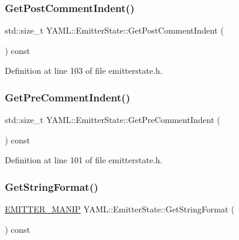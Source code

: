 \subsubsection{\texorpdfstring{GetPostCommentIndent()}{GetPostCommentIndent()}}
{\footnotesize\ttfamily std\+::size\+\_\+t Y\+A\+M\+L\+::\+Emitter\+State\+::\+Get\+Post\+Comment\+Indent (\begin{DoxyParamCaption}{ }\end{DoxyParamCaption}) const\hspace{0.3cm}{\ttfamily [inline]}}



Definition at line 103 of file emitterstate.\+h.

\mbox{\label{class_y_a_m_l_1_1_emitter_state_a21d540fa26b3cb55fd79c4d68d409572}} 
\subsubsection{\texorpdfstring{GetPreCommentIndent()}{GetPreCommentIndent()}}
{\footnotesize\ttfamily std\+::size\+\_\+t Y\+A\+M\+L\+::\+Emitter\+State\+::\+Get\+Pre\+Comment\+Indent (\begin{DoxyParamCaption}{ }\end{DoxyParamCaption}) const\hspace{0.3cm}{\ttfamily [inline]}}



Definition at line 101 of file emitterstate.\+h.

\mbox{\label{class_y_a_m_l_1_1_emitter_state_a16cb8ba88559cfefdf8054c4e7d50b7b}} 
\subsubsection{\texorpdfstring{GetStringFormat()}{GetStringFormat()}}
{\footnotesize\ttfamily \mbox{\hyperlink{namespace_y_a_m_l_a67c320aa50d3de7ecba1d0b8775dd684}{E\+M\+I\+T\+T\+E\+R\+\_\+\+M\+A\+N\+IP}} Y\+A\+M\+L\+::\+Emitter\+State\+::\+Get\+String\+Format (\begin{DoxyParamCaption}{ }\end{DoxyParamCaption}) const\hspace{0.3cm}{\ttfamily [inline]}}



